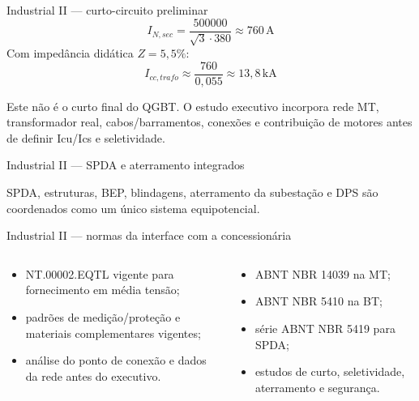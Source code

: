\begin{frame}{Industrial II — curto-circuito preliminar}
\small
\[I_{N,sec}=\frac{500000}{\sqrt3\cdot380}\approx760\,\mathrm{A}\]
Com impedância didática $Z=5{,}5\%$:
\[I_{cc,trafo}\approx\frac{760}{0{,}055}\approx13{,}8\,\mathrm{kA}\]
\begin{caixaAt}Este não é o curto final do QGBT. O estudo executivo incorpora rede MT, transformador real, cabos/barramentos, conexões e contribuição de motores antes de definir Icu/Ics e seletividade.\end{caixaAt}
\end{frame}

\begin{frame}{Industrial II — SPDA e aterramento integrados}
\centering
{}
\vspace{0.3mm}\scriptsize SPDA, estruturas, BEP, blindagens, aterramento da subestação e DPS são coordenados como um único sistema equipotencial.
\end{frame}

\begin{frame}{Industrial II — normas da interface com a concessionária}
\small
\begin{columns}[T,onlytextwidth]
\begin{caixaNorma}[title=Equatorial]\begin{itemize}\item NT.00002.EQTL vigente para fornecimento em média tensão;\item padrões de medição/proteção e materiais complementares vigentes;\item análise do ponto de conexão e dados da rede antes do executivo.\end{itemize}\end{caixaNorma}
\begin{caixaProjeto}[title=Instalação do cliente]\begin{itemize}\item ABNT NBR 14039 na MT;\item ABNT NBR 5410 na BT;\item série ABNT NBR 5419 para SPDA;\item estudos de curto, seletividade, aterramento e segurança.\end{itemize}\end{caixaProjeto}
\end{columns}
\end{frame}
